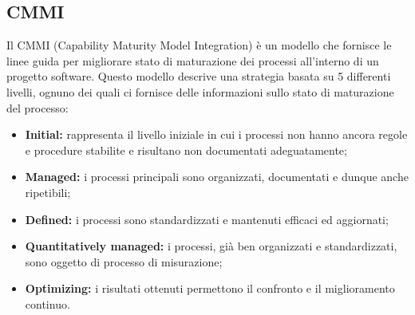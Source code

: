 \subsection{CMMI}
Il CMMI (Capability Maturity Model Integration) è un modello che fornisce le linee guida per migliorare stato di maturazione dei processi all'interno di un progetto software.
Questo modello descrive una strategia basata su 5 differenti livelli, ognuno dei quali ci fornisce delle informazioni sullo stato di maturazione del processo:
\begin{itemize}
	\item \textbf{Initial:} rappresenta il livello iniziale in cui i processi non hanno ancora regole e procedure stabilite e risultano non documentati adeguatamente;
	\item \textbf{Managed:} i processi principali sono organizzati, documentati e dunque anche ripetibili;
	\item \textbf{Defined:} i processi sono standardizzati e mantenuti efficaci ed aggiornati;
	\item \textbf{Quantitatively managed:} i processi, già ben organizzati e standardizzati, sono oggetto di processo di misurazione;
	\item \textbf{Optimizing:} i risultati ottenuti permettono il confronto e il miglioramento continuo.
\end{itemize}

